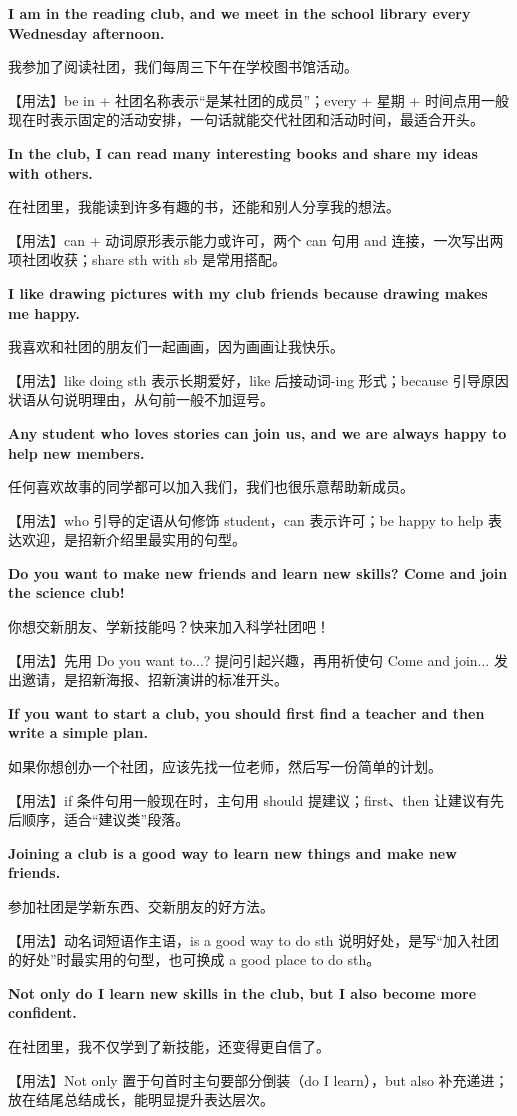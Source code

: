 \documentclass[UTF8,a4paper,11pt,oneside]{ctexbook}
\newcommand{\fansection}[1]{%
  \par\addvspace{2.4ex}%
  \Needspace{6\baselineskip}%
  \noindent{\sffamily\Large\bfseries\color{mainblue}#1}\par
  \nopagebreak
  \addvspace{0.2ex}%
  \noindent{\color{rulelight}\rule{\linewidth}{0.9pt}}\par
  \addvspace{0.9ex}%
  \nobreak
}
\newcommand{\fanpat}[3]{%
  \item{\bfseries #1}\par\nopagebreak
  {\small\color{textgray}#2}\par\nopagebreak
  {\footnotesize\color{accent!90!black}【用法】#3}\par
}
\begin{document}
\fansection{〇、本单元写作常用句型}
\begin{fanpatterns}
\fanpat{I am in the reading club, and we meet in the school library every Wednesday afternoon.}{我参加了阅读社团，我们每周三下午在学校图书馆活动。}{be in + 社团名称表示“是某社团的成员”；every + 星期 + 时间点用一般现在时表示固定的活动安排，一句话就能交代社团和活动时间，最适合开头。}

\fanpat{In the club, I can read many interesting books and share my ideas with others.}{在社团里，我能读到许多有趣的书，还能和别人分享我的想法。}{can + 动词原形表示能力或许可，两个 can 句用 and 连接，一次写出两项社团收获；share sth with sb 是常用搭配。}

\fanpat{I like drawing pictures with my club friends because drawing makes me happy.}{我喜欢和社团的朋友们一起画画，因为画画让我快乐。}{like doing sth 表示长期爱好，like 后接动词-ing 形式；because 引导原因状语从句说明理由，从句前一般不加逗号。}

\fanpat{Any student who loves stories can join us, and we are always happy to help new members.}{任何喜欢故事的同学都可以加入我们，我们也很乐意帮助新成员。}{who 引导的定语从句修饰 student，can 表示许可；be happy to help 表达欢迎，是招新介绍里最实用的句型。}

\fanpat{Do you want to make new friends and learn new skills? Come and join the science club!}{你想交新朋友、学新技能吗？快来加入科学社团吧！}{先用 Do you want to...? 提问引起兴趣，再用祈使句 Come and join... 发出邀请，是招新海报、招新演讲的标准开头。}

\fanpat{If you want to start a club, you should first find a teacher and then write a simple plan.}{如果你想创办一个社团，应该先找一位老师，然后写一份简单的计划。}{if 条件句用一般现在时，主句用 should 提建议；first、then 让建议有先后顺序，适合“建议类”段落。}

\fanpat{Joining a club is a good way to learn new things and make new friends.}{参加社团是学新东西、交新朋友的好方法。}{动名词短语作主语，is a good way to do sth 说明好处，是写“加入社团的好处”时最实用的句型，也可换成 a good place to do sth。}

\fanpat{Not only do I learn new skills in the club, but I also become more confident.}{在社团里，我不仅学到了新技能，还变得更自信了。}{Not only 置于句首时主句要部分倒装（do I learn），but also 补充递进；放在结尾总结成长，能明显提升表达层次。}

\end{fanpatterns}

\fansection{一、满分范文}
\end{document}
